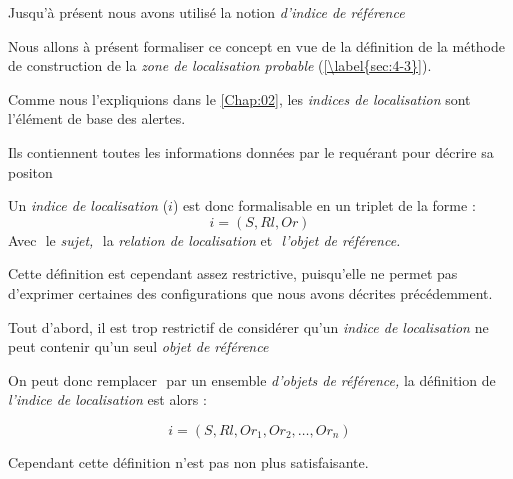 
Jusqu'à présent nous avons utilisé la notion \emph{d'indice de
  référence}

Nous allons à présent formaliser ce concept en vue de la définition de
la méthode de construction de la \emph{zone de localisation probable}
(\autoref{\label{sec:4-3}}).

Comme nous l'expliquions dans le \autoref{Chap:02}, les \emph{indices
  de localisation} sont l'élément de base des alertes.

Ils contiennent toutes les informations données par le requérant pour
décrire sa positon

Un \emph{indice de localisation} (\(i\)) est donc formalisable en un
triplet de la forme :
%
\begin{equation}
  i = (S, Rl, Or)
\end{equation}
%
Avec \(\) le \emph{sujet,} \(\) la \emph{relation de localisation} et
\(\) \emph{l'objet de référence.}

Cette définition est cependant assez restrictive, puisqu'elle ne
permet pas d'exprimer certaines des configurations que nous avons
décrites précédemment.                                                                                                                                             

Tout d'abord, il est trop restrictif de considérer qu'un \emph{indice
  de localisation} ne peut contenir qu'un seul \emph{objet de
  référence}

On peut donc remplacer \(\) par un ensemble \emph{d'objets de
  référence,} la définition de \emph{l'indice de localisation} est
alors :

\begin{equation}
  i = (S, Rl, {Or_1, Or_2, \ldots, Or_n})
\end{equation}

Cependant cette définition n'est pas non plus satisfaisante.

